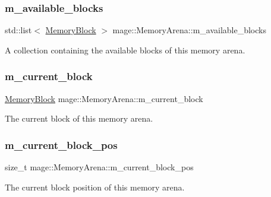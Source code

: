 \subsubsection{\texorpdfstring{m\+\_\+available\+\_\+blocks}{m\_available\_blocks}}
{\footnotesize\ttfamily std\+::list$<$ \hyperlink{classmage_1_1_memory_arena_a51f08f86660f163e2eef7c312e01700c}{Memory\+Block} $>$ mage\+::\+Memory\+Arena\+::m\+\_\+available\+\_\+blocks\hspace{0.3cm}{\ttfamily [private]}}

A collection containing the available blocks of this memory arena. \hypertarget{classmage_1_1_memory_arena_a2680b25146c174ac7fd639f1bd0acc7c}{}\label{classmage_1_1_memory_arena_a2680b25146c174ac7fd639f1bd0acc7c} 
\subsubsection{\texorpdfstring{m\+\_\+current\+\_\+block}{m\_current\_block}}
{\footnotesize\ttfamily \hyperlink{classmage_1_1_memory_arena_a51f08f86660f163e2eef7c312e01700c}{Memory\+Block} mage\+::\+Memory\+Arena\+::m\+\_\+current\+\_\+block\hspace{0.3cm}{\ttfamily [private]}}

The current block of this memory arena. \hypertarget{classmage_1_1_memory_arena_a880d07eb372ce1c8b907947fcbdfc59c}{}\label{classmage_1_1_memory_arena_a880d07eb372ce1c8b907947fcbdfc59c} 
\subsubsection{\texorpdfstring{m\+\_\+current\+\_\+block\+\_\+pos}{m\_current\_block\_pos}}
{\footnotesize\ttfamily size\+\_\+t mage\+::\+Memory\+Arena\+::m\+\_\+current\+\_\+block\+\_\+pos\hspace{0.3cm}{\ttfamily [private]}}

The current block position of this memory arena. \hypertarget{classmage_1_1_memory_arena_aeef4c56cf50fd3cbbba2879fcd028b86}{}\label{classmage_1_1_memory_arena_aeef4c56cf50fd3cbbba2879fcd028b86} 
